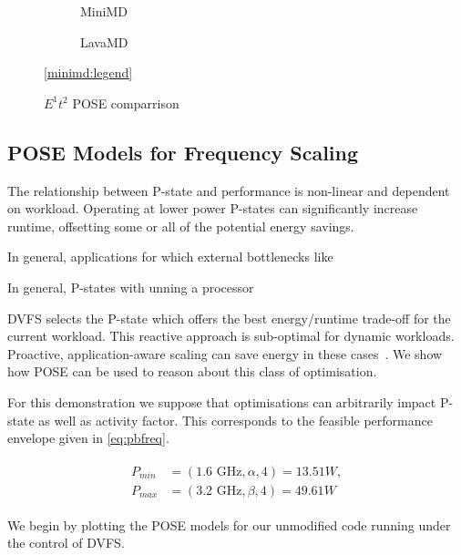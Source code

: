 \begin{figure}[t]%
  \providecommand{\plotwidth}{.95\linewidth}
  \begin{subfigure}[t]{.5\linewidth}%
    \caption{MiniMD}%
    \label{fig:minimd_pose}
  \end{subfigure}%
  \begin{subfigure}[t]{.5\linewidth}%
    \caption{LavaMD}%
    \label{fig:lavamd_pose}
  \end{subfigure}%
  \begin{center}%
    \ref{minimd:legend}%
  \end{center}%
  \caption{$E^1t^2$ POSE comparrison}%
  \label{fig:comparrison}%
\end{figure}


\subsection{POSE Models for Frequency Scaling}
The relationship between P-state and performance is non-linear and dependent on workload.
Operating at lower power P-states can significantly increase runtime, offsetting some or all of the potential energy savings.

In general, applications for which external bottlenecks like 

In general, P-states with unning a processor 


DVFS selects the P-state which offers the best energy/runtime trade-off for the current workload.
This reactive approach is sub-optimal for dynamic workloads.
Proactive, application-aware scaling can save energy in these cases~\cite{choi:2004aa}.
We show how POSE can be used to reason about this class of optimisation.

For this demonstration we suppose that optimisations can arbitrarily impact P-state as well as activity factor.
This corresponds to the feasible performance envelope given in \autoref{eq:pbfreq}.

\begin{align}
  \label{eq:pbfreq}
  \begin{split}
    P_{min} &= (1.6\text{ GHz}, \alpha, 4) = 13.51W, \\
    P_{max} &= (3.2\text{ GHz}, \beta, 4) = 49.61W
  \end{split}
\end{align}

We begin by plotting the POSE models for our unmodified code running under the control of DVFS. 


